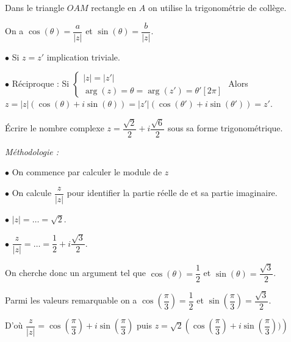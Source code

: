 \documentclass[10pt,a4paper]{article}
\begin{document}
\dem Dans le triangle $OAM$ rectangle en $A$ on utilise la trigonométrie de collège.

On a $\cos(\theta)=\dfrac{a}{|z|}$ et $\sin(\theta)=\dfrac{b}{|z|}$.




\dem 

$\bullet$ Si $z=z'$ implication triviale.

$\bullet$ Réciproque : Si $\left\lbrace \begin{array}{l} |z|=|z'| \\ \arg(z)=\theta=\arg(z')=\theta'[2\pi]  \end{array} \right.$
Alors $z=|z|(\cos(\theta)+i \sin(\theta))=|z'|(\cos(\theta')+i \sin(\theta'))=z'$.



\exe Écrire le nombre complexe $z= \dfrac{\sqrt{2}}{2}+i \dfrac{\sqrt{6}}{2}$ sous sa forme trigonométrique.

\textit{Méthodologie :}

$\bullet$ On commence par calculer le module de $z$

$\bullet$ On calcule $\dfrac{z}{|z|}$ pour identifier la partie réelle de et sa partie imaginaire.

$\bullet$ $|z|= \dots = \sqrt{2}$.

$\bullet$ $\dfrac{z}{|z|}= \dots = \dfrac{1}{2} + i \dfrac{\sqrt{3}}{2}$.

On cherche donc un argument tel que $\cos(\theta)=\dfrac{1}{2}$ et $\sin(\theta)=\dfrac{\sqrt{3}}{2}$.

Parmi les valeurs remarquable on a $\cos(\dfrac{\pi}{3})=\dfrac{1}{2}$ et $\sin(\dfrac{\pi}{3})=\dfrac{\sqrt{3}}{2}$.

D'où $\dfrac{z}{|z|} = \cos(\dfrac{\pi}{3}) + i \sin(\dfrac{\pi}{3})$ puis $z=\sqrt{2} \left(\cos(\dfrac{\pi}{3}) + i \sin(\dfrac{\pi}{3}))\right)$
\end{document}
